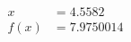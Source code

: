 \documentclass[preview]{standalone}
\begin{document}
\begin{align*}
x &= 4.5582\\f(x) &= 7.9750014
\end{align*}
\end{document}
